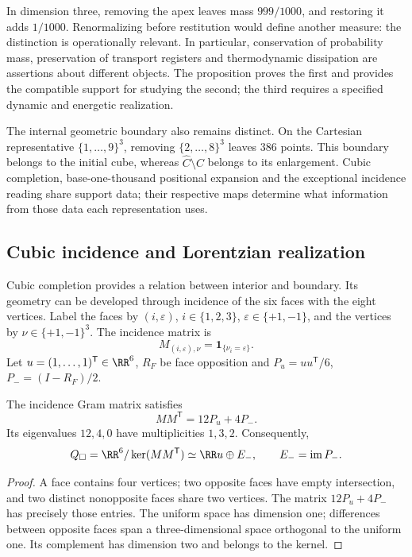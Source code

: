 In dimension three, removing the apex leaves mass \(999/1000\), and
restoring it adds \(1/1000\). Renormalizing before restitution
would define another measure: the distinction is operationally relevant.
In particular, conservation of probability mass, preservation of
transport registers and thermodynamic dissipation are assertions about
different objects. The proposition proves the first and provides the
compatible support for studying the second; the third requires a
specified dynamic and energetic realization.

The internal geometric boundary also remains distinct.
On the Cartesian representative \(\{1,\ldots,9\}^3\), removing
\(\{2,\ldots,8\}^3\) leaves \(386\) points. This boundary belongs to the
initial cube, whereas \(\widehat C\setminus C\) belongs to its
enlargement. Cubic completion, base-one-thousand positional expansion and
the exceptional incidence reading share support data;
their respective maps determine what information from those data each
representation uses.




\subsection{Cubic incidence and Lorentzian realization}

Cubic completion provides a relation between interior and boundary.
Its geometry can be developed through incidence of the six faces
with the eight vertices. Label the faces by \((i,\varepsilon)\),
\(i\in\{1,2,3\}\), \(\varepsilon\in\{+1,-1\}\), and the vertices by
\(\nu\in\{+1,-1\}^3\). The incidence matrix is
\[
 M_{(i,\varepsilon),\nu}=\mathbf1_{\{\nu_i=\varepsilon\}}.
\]
Let \(u=(1,\ldots,1)^{\mathsf T}\in\RR^6\), \(R_F\) be face
opposition and \(P_u=uu^{\mathsf T}/6\), \(P_-=(I-R_F)/2\).

\begin{proposition}
The incidence Gram matrix satisfies
\[
 MM^{\mathsf T}=12P_u+4P_-.
\]
Its eigenvalues \(12,4,0\) have multiplicities \(1,3,2\).
Consequently,
\[
 Q_\square=\RR^6/\ker(MM^{\mathsf T})
 \simeq\RR u\oplus E_-,\qquad E_-=\operatorname{im}P_-.
\]
\end{proposition}
\begin{proof}
A face contains four vertices; two opposite faces have empty
intersection, and two distinct nonopposite faces share two vertices.
The matrix \(12P_u+4P_-\) has precisely those entries.
The uniform space has dimension one; differences between opposite
faces span a three-dimensional space orthogonal to the uniform one.
Its complement has dimension two and belongs to the kernel.
\end{proof}

